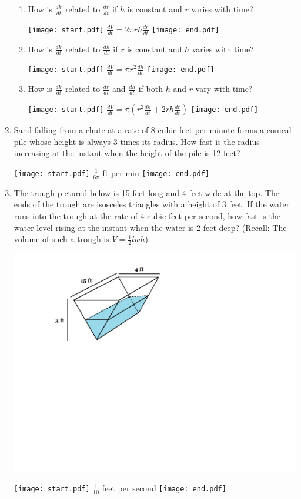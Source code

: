 \documentclass[12pt]{article}
\begin{document}
\begin{enumerate}
\begin{enumerate}

\item How is $\frac{dV}{dt}$ related to $\frac{dr}{dt}$ if $h$ is constant and $r$ varies with time?

\texttt{[image: start.pdf]}
{{$\frac{dV}{dt}=2\pi r h \frac{dr}{dt}$}}
\texttt{[image: end.pdf]}


\item How is $\frac{dV}{dt}$ related to $\frac{dh}{dt}$ if $r$ is constant and $h$ varies with time?

\texttt{[image: start.pdf]}
{{$\frac{dV}{dt}=\pi r^2 \frac{dh}{dt}$}}
\texttt{[image: end.pdf]}


\item How is $\frac{dV}{dt}$ related to $\frac{dr}{dt}$ and $\frac{dh}{dt}$ if both $h$ and $r$ vary with time?

\texttt{[image: start.pdf]}
{{$\frac{dV}{dt}=\pi\left(r^2 \frac{dh}{dt}+2rh \frac{dr}{dt}\right)$}}
\texttt{[image: end.pdf]}


\end{enumerate}

\item Sand falling from a chute at a rate of 8 cubic feet per minute forms a conical pile whose height is always 3 times its radius.  How fast is the radius increasing at the instant when the height of the pile is 12 feet? 

\texttt{[image: start.pdf]}
{{$\frac{1}{6\pi}$ ft per min}}
\texttt{[image: end.pdf]}


\newpage

\item The trough pictured below is 15 feet long and 4 feet wide at the top.  The ends of the trough are isosceles triangles with a height of 3 feet.  If the water runs into the trough at the rate of 4 cubic feet per second, how fast is the water level rising at the instant when the water is 2 feet deep? (Recall: The volume of such a trough is $V=\frac{1}{2}lwh$)
\begin{center}
\includegraphics[scale=0.6]{trough.pdf}
\end{center}
\texttt{[image: start.pdf]}
{{$\frac{1}{10}$ feet per second}}
\texttt{[image: end.pdf]}



\end{enumerate}
\end{document}
